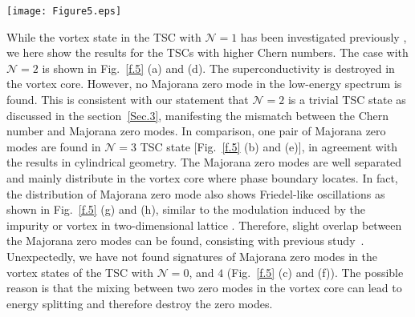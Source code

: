 \documentclass[12pt]{iopart}
\begin{document}
\begin{figure*}[tbp]
\centering
\texttt{[image: Figure5.eps]}
\caption{(Color online). The superconducting order parameters and low-energy spectra of the vortex states. (a) and (d) are for $\mathcal{N}=2$ TSC with parameters $\phi=\pi/12$, $\mu=-0.9$, and $V=3$; (b) and (e) are for $\mathcal{N}=-3$ TSC with parameters $\phi=5\pi/12$, $\mu=3$, $V=2.4$; and (c) and (f) are for $\mathcal{N}=-4$ TSC with parameters $\phi=0.2\pi$, $\mu=2.2$, $V=2$. (g) and (h) display the distributions of Majorana zero modes in $\mathcal{N}=-3$ TSC with the same parameters in (b).}\label{f.5}
\end{figure*}

While the vortex state in the TSC with $\mathcal{N}=1$ has been investigated previously \cite{Read-PRB2000}, we here show the results for the TSCs with higher Chern numbers. The case with $\mathcal{N}=2$ is shown in Fig.~\ref{f.5} (a) and (d). The superconductivity is destroyed in the vortex core. However, no Majorana zero mode in the low-energy spectrum is found. This is consistent with our statement that $\mathcal{N}=2$ is a trivial TSC state as discussed in the section~\ref{Sec.3}, manifesting the mismatch between the Chern number and Majorana zero modes. In comparison, one pair of Majorana zero modes are found in $\mathcal{N}=3$ TSC state [Fig.~\ref{f.5} (b) and (e)], in agreement with the results in cylindrical geometry. The Majorana zero modes are well separated and mainly distribute in the vortex core where phase boundary locates. In fact, the distribution of Majorana zero mode also shows Friedel-like oscillations as shown in Fig.~\ref{f.5} (g) and (h), similar to the modulation induced by the impurity or vortex in two-dimensional lattice \cite{ZhuJX-PRL2002,ChenY-PRL2004}. Therefore, slight overlap between the Majorana zero modes can be found, consisting with previous study~\cite{ZhouT-PRB2013}. Unexpectedly, we have not found signatures of Majorana zero modes in the vortex states of the TSC with $\mathcal{N}=0$, and $4$ (Fig.~\ref{f.5} (c) and (f)). The possible reason is that the mixing between two zero modes in the vortex core can lead to energy splitting and therefore destroy the zero modes.
\end{document}
